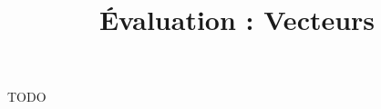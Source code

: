 \documentclass[
	classe=$2^{de}$
]{évaluation}
\title{Évaluation : Vecteurs}
\author{}
\date{}
\begin{document}
\maketitle

\begin{exercice}
	TODO
\end{exercice}
\end{document}
